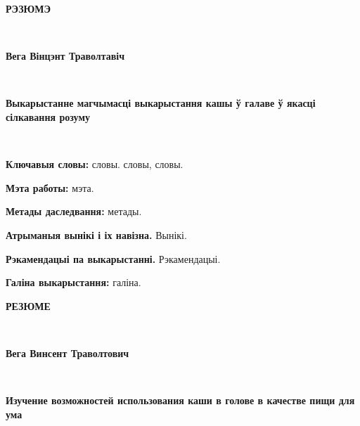 \newpage
\begin{center}
\textbf{РЭЗЮМЭ}
\end{center}

~

\vspace{-10pt}
\begin{center}
\textbf{Вега Вінцэнт Траволтавіч}
\end{center}

~

\vspace{-10pt}
\begin{center}
\textbf{Выкарыстанне магчымасці выкарыстання кашы ў галаве ў якасці сілкавання розуму}
\end{center}

~

\vspace{-10pt}
\textbf{Ключавыя словы:}
словы. словы, словы.


\textbf{Мэта работы:}
мэта.

\textbf{Метады даследвання:}
метады.

\textbf{Атрыманыя вынікі і іх навізна.}
Вынікі.

\textbf{Рэкамендацыі па выкарыстанні.}
Рэкамендацыі.

\textbf{Галіна выкарыстання:}
галіна.



\newpage
\begin{center}
\textbf{РЕЗЮМЕ}
\end{center}

~

\vspace{-10pt}
\begin{center}
\textbf{Вега Винсент Траволтович}
\end{center}

~

\vspace{-10pt}
\begin{center}
\textbf{Изучение возможностей использования каши в голове в качестве пищи для ума}
\end{center}

